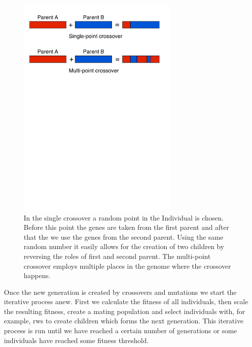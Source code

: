 \begin{figure}[htbp] %
   \centering
   \includegraphics[width=0.7\textwidth,trim=0 18cm 0 0]{chapter_ga/plots/crossovers.pdf} 
   \caption{In the single crossover a random point in the Individual is chosen. Before this point the genes are taken from the first parent and after that the we use the genes from the second parent. Using the same random number it easily allows for the creation of two children by reversing the roles of first and second parent. The multi-point crossover employs multiple places in the genome where the crossover happens.}
   \label{fig:crossover}
\end{figure}

Once the new generation is created by \glspl{crossover} and \glspl{mutation} we start the iterative process anew. First we calculate the \gls{fitness} of all \glspl{individual}, then scale the resulting \gls{fitness}, create a mating population and select \glspl{individual} with, for example, \gls{rws}  to create children which forms the next generation. This iterative process is run until we have reached a certain number of generations or some \glspl{individual} have reached some \gls{fitness} threshold. 

